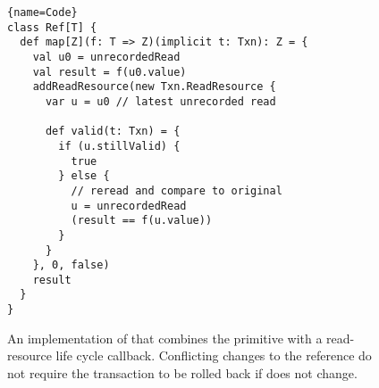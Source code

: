 \begin{figure}
\begin{lstlisting}{name=Code}
class Ref[T] {
  def map[Z](f: T => Z)(implicit t: Txn): Z = {
    val u0 = unrecordedRead
    val result = f(u0.value)
    addReadResource(new Txn.ReadResource {
      var u = u0 // latest unrecorded read
  
      def valid(t: Txn) = {
        if (u.stillValid) {
          true
        } else {
          // reread and compare to original
          u = unrecordedRead
          (result == f(u.value))
        }
      }
    }, 0, false)
    result
  }
}
\end{lstlisting}

\caption{An implementation of  that combines the
 primitive with a read-resource life cycle callback.
Conflicting changes to the reference do not require the transaction to
be rolled back if  does not change.}

\label{fig:map}
\end{figure}
